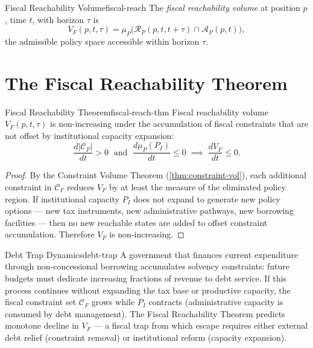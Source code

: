 \documentclass[12pt,twoside,openright]{book}
\newcommand{\reach}{\mathcal{R}}
\newcommand{\adm}{\mathcal{A}}
\begin{document}
\begin{definition}{Fiscal Reachability Volume}{fiscal-reach}
  The \emph{fiscal reachability volume} at position $p$,
  time $t$, with horizon $\tau$ is
  \[
    V_F(p, t, \tau)
    = \mu_P\!\bigl(
        \reach_P(p, t, t+\tau)
        \cap \adm_P(p, t)
      \bigr),
  \]
  the admissible policy space accessible within horizon
  $\tau$.
\end{definition}

\section{The Fiscal Reachability Theorem}

\begin{theorem}{Fiscal Reachability Theorem}{fiscal-reach-thm}
  Fiscal reachability volume $V_F(p,t,\tau)$ is
  non-increasing under the accumulation of fiscal
  constraints that are not offset by institutional
  capacity expansion:
  \[
    \frac{d|\mathcal{C}_F|}{dt} > 0
    \;\text{ and }\;
    \frac{d\mu_P(P_I)}{dt} \le 0
    \;\implies\;
    \frac{dV_F}{dt} \le 0.
  \]
\end{theorem}

\begin{proof}
  By the Constraint Volume Theorem
  (\cref{thm:constraint-vol}), each additional constraint
  in $\mathcal{C}_F$ reduces $V_F$ by at least
  the measure of the eliminated policy region.
  If institutional capacity $P_I$ does not expand to
  generate new policy options — new tax instruments,
  new administrative pathways, new borrowing facilities
  — then no new reachable states are added to offset
  constraint accumulation.
  Therefore $V_F$ is non-increasing.
\end{proof}

\begin{example}{Debt Trap Dynamics}{debt-trap}
  A government that finances current expenditure through
  non-concessional borrowing accumulates solvency
  constraints: future budgets must dedicate increasing
  fractions of revenue to debt service.
  If this process continues without expanding the tax
  base or productive capacity, the fiscal constraint set
  $\mathcal{C}_F$ grows while $P_I$ contracts
  (administrative capacity is consumed by debt management).
  The Fiscal Reachability Theorem predicts monotone
  decline in $V_F$ — a fiscal trap from which escape
  requires either external debt relief (constraint
  removal) or institutional reform (capacity expansion).
\end{example}
\end{document}
